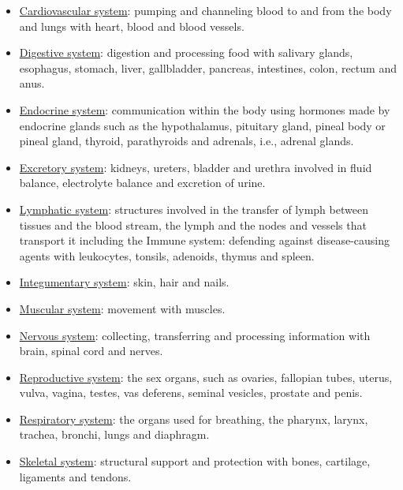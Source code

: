 \begin{itemize}
\tightlist
\item
  \href{https://en.wikipedia.org/wiki/Circulatory_system}{Cardiovascular
  system}: pumping and channeling blood to and from the body and lungs
  with heart, blood and blood vessels.
\item
  \href{https://en.wikipedia.org/wiki/Human_digestive_system}{Digestive
  system}: digestion and processing food with salivary glands,
  esophagus, stomach, liver, gallbladder, pancreas, intestines, colon,
  rectum and anus.
\item
  \href{https://en.wikipedia.org/wiki/Endocrine_system}{Endocrine
  system}: communication within the body using hormones made by
  endocrine glands such as the hypothalamus, pituitary gland, pineal
  body or pineal gland, thyroid, parathyroids and adrenals, i.e.,
  adrenal glands.
\item
  \href{https://en.wikipedia.org/wiki/Excretory_system}{Excretory
  system}: kidneys, ureters, bladder and urethra involved in fluid
  balance, electrolyte balance and excretion of urine.
\item
  \href{https://en.wikipedia.org/wiki/Lymphatic_system}{Lymphatic
  system}: structures involved in the transfer of lymph between tissues
  and the blood stream, the lymph and the nodes and vessels that
  transport it including the Immune system: defending against
  disease-causing agents with leukocytes, tonsils, adenoids, thymus and
  spleen.
\item
  \href{https://en.wikipedia.org/wiki/Integumentary_system}{Integumentary
  system}: skin, hair and nails.
\item
  \href{https://en.wikipedia.org/wiki/Muscular_system}{Muscular system}:
  movement with muscles.
\item
  \href{https://en.wikipedia.org/wiki/Nervous_system}{Nervous system}:
  collecting, transferring and processing information with brain, spinal
  cord and nerves.
\item
  \href{https://en.wikipedia.org/wiki/Reproductive_system}{Reproductive
  system}: the sex organs, such as ovaries, fallopian tubes, uterus,
  vulva, vagina, testes, vas deferens, seminal vesicles, prostate and
  penis.
\item
  \href{https://en.wikipedia.org/wiki/Respiratory_system}{Respiratory
  system}: the organs used for breathing, the pharynx, larynx, trachea,
  bronchi, lungs and diaphragm.
\item
  \href{https://en.wikipedia.org/wiki/Skeleton}{Skeletal system}:
  structural support and protection with bones, cartilage, ligaments and
  tendons.
\end{itemize}

